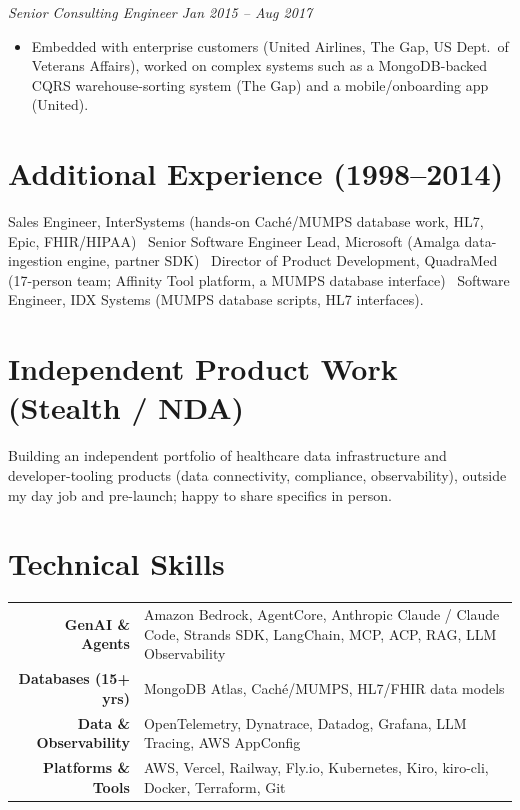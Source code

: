 \documentclass[10pt,letterpaper]{article}
\begin{document}
{\small\itshape\color{accent} Senior Consulting Engineer \hfill Jan 2015 -- Aug 2017}
\begin{itemize}
\item {\small Embedded with enterprise customers (United Airlines, The Gap, US Dept.\ of Veterans Affairs), worked on complex systems such as a MongoDB-backed CQRS warehouse-sorting system (The Gap) and a mobile/onboarding app (United).}
\end{itemize}

\section{Additional Experience (1998--2014)}
{\small Sales Engineer, InterSystems (hands-on Cach\'e/MUMPS database work, HL7, Epic, FHIR/HIPAA) \textbar\ Senior Software Engineer Lead, Microsoft (Amalga data-ingestion engine, partner SDK) \textbar\ Director of Product Development, QuadraMed (17-person team; Affinity Tool platform, a MUMPS database interface) \textbar\ Software Engineer, IDX Systems (MUMPS database scripts, HL7 interfaces).}

\section{Independent Product Work (Stealth / NDA)}
{\small Building an independent portfolio of healthcare data infrastructure and developer-tooling products (data connectivity, compliance, observability), outside my day job and pre-launch; happy to share specifics in person.}

\section{Technical Skills}
{\renewcommand{\arraystretch}{0.85}
\begin{tabularx}{\textwidth}{@{}r X@{}}
{\small\bfseries\color{accent} GenAI \& Agents} & {\small Amazon Bedrock, AgentCore, Anthropic Claude / Claude Code, Strands SDK, LangChain, MCP, ACP, RAG, LLM Observability} \\
{\small\bfseries\color{accent} Databases (15+ yrs)} & {\small MongoDB Atlas, Cach\'e/MUMPS, HL7/FHIR data models} \\
{\small\bfseries\color{accent} Data \& Observability} & {\small OpenTelemetry, Dynatrace, Datadog, Grafana, LLM Tracing, AWS AppConfig} \\
{\small\bfseries\color{accent} Platforms \& Tools} & {\small AWS, Vercel, Railway, Fly.io, Kubernetes, Kiro, kiro-cli, Docker, Terraform, Git} \\
\end{tabularx}}
\end{document}
